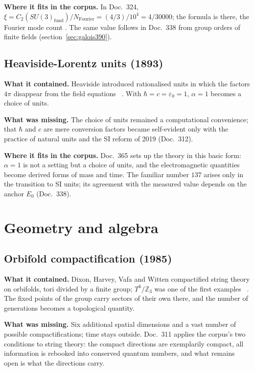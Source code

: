 \textbf{Where it fits in the corpus.} In Doc.~324, $\xi=C_2(SU(3)_{\mathrm{fund}})/N_{\mathrm{Fourier}}
=(4/3)/10^4=4/30000$; the formula is \BM{} there, the Fourier mode count \KM. The same value follows
in Doc.~338 from group orders of finite fields (section~\ref{sec:galois390}).

\subsection{Heaviside-Lorentz units (1893)}

\textbf{What it contained.} Heaviside introduced rationalised units in which the factors $4\pi$
disappear from the field equations \QM~\cite{Heaviside1893}. With $\hbar=c=\varepsilon_0=1$,
$\alpha=1$ becomes a choice of units.

\textbf{What was missing.} The choice of units remained a computational convenience; that $\hbar$
and $c$ are mere conversion factors became self-evident only with the practice of natural units and
the SI reform of 2019 (Doc.~312).

\textbf{Where it fits in the corpus.} Doc.~365 sets up the theory in this basic form: $\alpha=1$ is not
a setting but a choice of units, and the electromagnetic quantities become derived forms of mass
and time. The familiar number $137$ arises only in the transition to SI units; its agreement with
the measured value depends on the anchor $E_0$ (Doc.~338).

\section{Geometry and algebra}

\subsection{Orbifold compactification (1985)}

\textbf{What it contained.} Dixon, Harvey, Vafa and Witten compactified string theory on orbifolds,
tori divided by a finite group; $T^6/\mathbb{Z}_3$ was one of the first examples
\QM~\cite{DHVW1985}. The fixed points of the group carry sectors of their own there, and the number
of generations becomes a topological quantity.

\textbf{What was missing.} Six additional spatial dimensions and a vast number of possible
compactifications; time stays outside. Doc.~311 applies the corpus's two conditions to string
theory: the compact directions are exemplarily compact, all information is rebooked into conserved
quantum numbers, and what remains open is what the directions carry.

